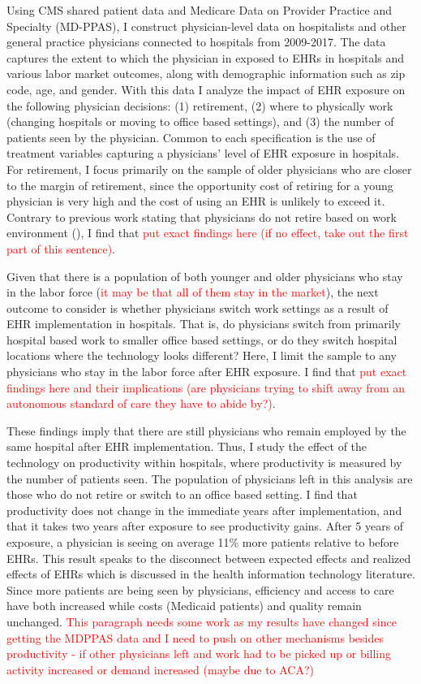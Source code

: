 \documentclass[11pt]{article}
\begin{document}
Using CMS shared patient data and Medicare Data on Provider Practice and Specialty (MD-PPAS), I construct physician-level data on hospitalists and other general practice physicians connected to hospitals from 2009-2017. The data captures the extent to which the physician in exposed to EHRs in hospitals and various labor market outcomes, along with demographic information such as zip code, age, and gender. With this data I analyze the impact of EHR exposure on the following physician decisions: (1) retirement, (2) where to physically work (changing hospitals or moving to office based settings), and (3) the number of patients seen by the physician. Common to each specification is the use of treatment variables capturing a physicians' level of EHR exposure in hospitals.  For retirement, I focus primarily on the sample of older physicians who are closer to the margin of retirement, since the opportunity cost of retiring for a young physician is very high and the cost of using an EHR is unlikely to exceed it. Contrary to previous work stating that physicians do not retire based on work environment (\cite{Bahrami2002}), I find that \textcolor{red}{put exact findings here (if no effect, take out the first part of this sentence)}. 

Given that there is a population of both younger and older physicians who stay in the labor force (\textcolor{red}{it may be that all of them stay in the market}), the next outcome to consider is whether physicians switch work settings as a result of EHR implementation in hospitals. That is, do physicians switch from primarily hospital based work to smaller office based settings, or do they switch hospital locations where the technology looks different?  Here, I limit the sample to any physicians who stay in the labor force after EHR exposure. I find that \textcolor{red}{put exact findings here and their implications (are physicians trying to shift away from an autonomous standard of care they have to abide by?)}. 

These findings imply that there are still physicians who remain employed by the same hospital after EHR implementation. Thus, I study the effect of the technology on productivity within hospitals, where productivity is measured by the number of patients seen. The population of physicians left in this analysis are those who do not retire or switch to an office based setting. I find that productivity does not change in the immediate years after implementation, and that it takes two years after exposure to see productivity gains. After 5 years of exposure, a physician is seeing on average 11\% more patients relative to before EHRs. This result speaks to the disconnect between expected effects and realized effects of EHRs which is discussed in the health information technology literature. Since more patients are being seen by physicians, efficiency and access to care have both increased while costs (Medicaid patients) and quality remain unchanged. \textcolor{red}{This paragraph needs some work as my results have changed since getting the MDPPAS data and I need to push on other mechanisms besides productivity - if other physicians left and work had to be picked up or billing activity increased or demand increased (maybe due to ACA?)}
\end{document}
